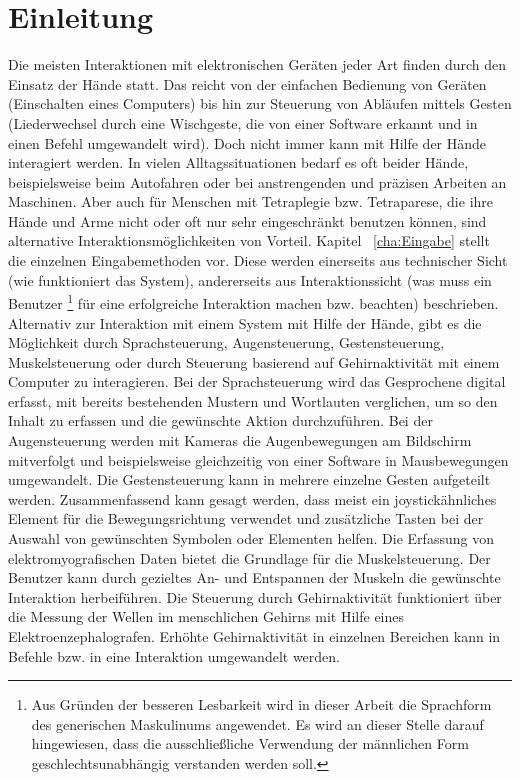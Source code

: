 \chapter{Einleitung}
\label{cha:Einleitung}

Die meisten Interaktionen mit elektronischen Geräten jeder Art finden durch den Einsatz der Hände statt. Das reicht von der einfachen Bedienung von Geräten (\zB Einschalten eines Computers) bis hin zur Steuerung von Abläufen mittels Gesten (\zB Liederwechsel durch eine Wischgeste, die von einer Software erkannt und in einen Befehl umgewandelt wird). Doch nicht immer kann mit Hilfe der Hände interagiert werden. 
In vielen Alltagssituationen bedarf es oft beider Hände, beispielsweise beim Autofahren oder bei anstrengenden und präzisen Arbeiten an Maschinen. Aber auch für Menschen mit Tetraplegie bzw. Tetraparese, die ihre Hände und Arme nicht oder oft nur sehr eingeschränkt benutzen können, sind alternative Interaktionsmöglichkeiten von Vorteil.
\newline \newline
Kapitel ~\ref{cha:Eingabe} stellt die einzelnen Eingabemethoden vor. Diese werden einerseits aus technischer Sicht (wie funktioniert das System), andererseits aus Interaktionssicht (was muss ein Benutzer%
\footnote{Aus Gründen der besseren Lesbarkeit wird in dieser Arbeit die Sprachform des generischen Maskulinums angewendet. Es wird an dieser Stelle darauf hingewiesen, dass die ausschließliche Verwendung der männlichen Form geschlechtsunabhängig verstanden werden soll.}
%
 für eine erfolgreiche Interaktion machen bzw. beachten) beschrieben. Alternativ zur Interaktion mit einem System mit Hilfe der Hände, gibt es die Möglichkeit durch Sprachsteuerung, Augensteuerung, Gestensteuerung, Muskelsteuerung oder durch Steuerung basierend auf Gehirnaktivität mit einem Computer zu interagieren. Bei der Sprachsteuerung wird das Gesprochene digital erfasst, mit bereits bestehenden Mustern und Wortlauten verglichen, um so den Inhalt zu erfassen und die gewünschte Aktion durchzuführen. Bei der Augensteuerung werden mit Kameras die Augenbewegungen am Bildschirm mitverfolgt und beispielsweise gleichzeitig von einer Software in Mausbewegungen umgewandelt. Die Gestensteuerung kann in mehrere einzelne Gesten aufgeteilt werden. Zusammenfassend kann gesagt werden, dass meist ein joystickähnliches Element für die Bewegungsrichtung verwendet und zusätzliche Tasten bei der Auswahl von gewünschten Symbolen oder Elementen helfen. Die Erfassung von elektromyografischen Daten bietet die Grundlage für die Muskelsteuerung. Der Benutzer kann durch gezieltes An- und Entspannen der Muskeln die gewünschte Interaktion herbeiführen. Die Steuerung durch Gehirnaktivität funktioniert über die Messung der Wellen im menschlichen Gehirns mit Hilfe eines  Elektroenzephalografen. Erhöhte Gehirnaktivität in einzelnen Bereichen kann in Befehle bzw. in eine Interaktion umgewandelt werden.

